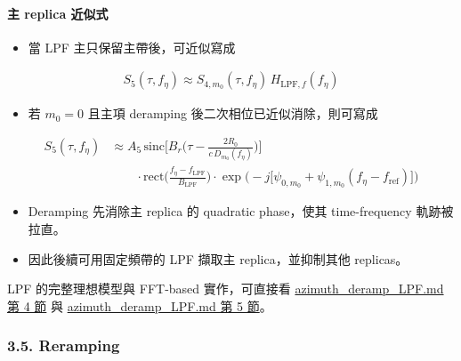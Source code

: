 \documentclass[11pt]{article}
\providecommand{\tightlist}{%
  \setlength{\itemsep}{0pt}\setlength{\parskip}{0pt}}
\begin{document}
\hypertarget{ux4e3b-replica-ux8fd1ux4f3cux5f0f}{%
\paragraph{主 replica 近似式}\label{ux4e3b-replica-ux8fd1ux4f3cux5f0f}}

\begin{itemize}
\tightlist
\item
  當 LPF 主只保留主帶後，可近似寫成
\end{itemize}

\begin{equation}
\begin{aligned}
S_5(\tau,f_\eta)\approx S_{4,m_0}(\tau,f_\eta)\,H_{\mathrm{LPF},f}(f_\eta)
\end{aligned}
\end{equation}

\begin{itemize}
\tightlist
\item
  若 \(m_0=0\) 且主項 deramping 後二次相位已近似消除，則可寫成
\end{itemize}

\begin{equation}
\begin{aligned}
S_5(\tau,f_\eta)
&\approx
A_5\,
\mathrm{sinc}\biggl[B_r\biggl(\tau-\frac{2R_0}{c\,D_{m_0}(f_\eta)}\biggr)\biggr]\\
&\qquad \cdot \mathrm{rect}\biggl(\frac{f_\eta-f_{\mathrm{LPF}}}{B_{\mathrm{LPF}}}\biggr)
\cdot \exp\biggl(-j\biggl[\psi_{0,m_0}+\psi_{1,m_0}(f_\eta-f_{\mathrm{ref}})\biggr]\biggr)
\end{aligned}
\end{equation}

\begin{itemize}
\tightlist
\item
  Deramping 先消除主 replica 的 quadratic phase，使其 time-frequency
  軌跡被拉直。
\item
  因此後續可用固定頻帶的 LPF 擷取主 replica，並抑制其他 replicas。
\end{itemize}

LPF 的完整理想模型與 FFT-based 實作，可直接看
\href{./azimuth_deramp_LPF.md\#4-ideal-lpf-model}{azimuth\_deramp\_LPF.md 第 4 節}
與
\href{./azimuth_deramp_LPF.md\#5-fft-based-lpf-implementation}{azimuth\_deramp\_LPF.md 第 5 節}。

\hypertarget{reramping}{%
\subsubsection{3.5. Reramping}\label{reramping}}
\end{document}
